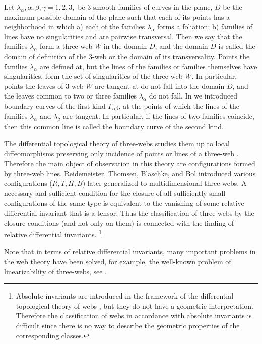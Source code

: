 \documentclass[
11pt,%
tightenlines,%
twoside,%
onecolumn,%
nofloats,%
nobibnotes,%
nofootinbib,%
superscriptaddress,%
noshowpacs,%
centertags]%
{revtex4}
\begin{document}
 Let $\lambda_\alpha,  \alpha, \beta, \gamma = 1, 2, 3,$  be 3 smooth families of curves in the plane, $D$ be the maximum possible domain of the plane such that each of its points has a neighborhood in which a) each of the families $ \lambda_\alpha $ forms a foliation; b) families of lines have no singularities and are pairwise transversal. Then we say that the families $\lambda_\alpha$ form a three-web $W$ in the domain $D$, and the domain $D$ is called the domain of definition of the 3-web or the domain of its transversality. Points the families $\lambda_\alpha$ are defined at, but the lines of the families or families themselves have singularities, form the set of singularities of the three-web $W$. In particular, points  the leaves of 3-web $W$ are tangent at do not fall into the domain $D$, and the leaves common to two or three families $\lambda_\alpha$ do not fall. In \cite{SLU} we introduced
  boundary curves of the first kind
$\Gamma_{\alpha\beta}$, at the points of which the lines of the families $\lambda_\alpha$ and $\lambda_\beta$ are tangent. In particular, if the lines of two families coincide, then this common line is called the  boundary curve of the second kind.


The differential topological theory of three-webs studies them  up to local diffeomorphisms preserving only incidence of points or lines of a three-web \cite{B}. Therefore the main object of observation in this theory are configurations formed by three-web lines. Reidemeister, Thomsen, Blaschke, and Bol introduced various configurations ($R, T, H, B$) later generalized to multidimensional three-webs. A necessary and sufficient condition for the closure of all sufficiently small configurations of the same type is equivalent to the vanishing of some relative differential invariant that is a tensor. Thus the classification of three-webs by the closure conditions (and not only
on them) is connected with the finding of relative differential invariants.
\footnote {Absolute invariants are introduced in the framework of the differential topological theory of webs \cite{SLU}, but they do not have a geometric interpretation. Therefore the classification of webs in accordance with absolute invariants is difficult since there is no way to describe the geometric properties of the corresponding classes.}

Note that in terms of relative differential invariants, many important problems in the web theory have been solved, for example, the well-known problem of linearizability of three-webs, see \cite{GL}.
\end{document}
